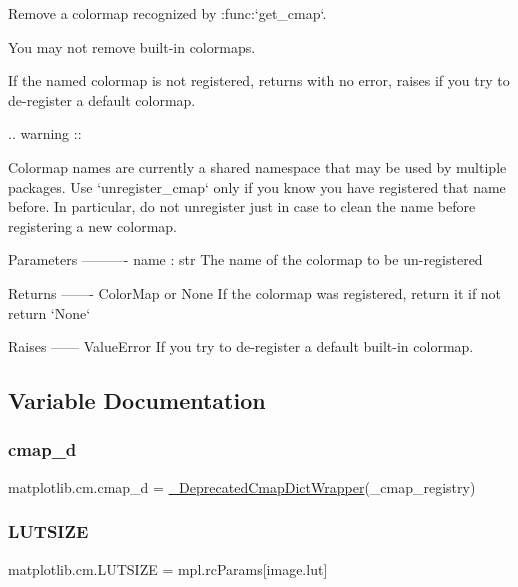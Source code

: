 \begin{DoxyVerb}Remove a colormap recognized by :func:`get_cmap`.

You may not remove built-in colormaps.

If the named colormap is not registered, returns with no error, raises
if you try to de-register a default colormap.

.. warning ::

  Colormap names are currently a shared namespace that may be used
  by multiple packages. Use `unregister_cmap` only if you know you
  have registered that name before. In particular, do not
  unregister just in case to clean the name before registering a
  new colormap.

Parameters
----------
name : str
    The name of the colormap to be un-registered

Returns
-------
ColorMap or None
    If the colormap was registered, return it if not return `None`

Raises
------
ValueError
   If you try to de-register a default built-in colormap.\end{DoxyVerb}
 

\subsection{Variable Documentation}
\mbox{\label{namespacematplotlib_1_1cm_ac2dd962b18f824e3ad20f79097390148}} 
\subsubsection{\texorpdfstring{cmap\+\_\+d}{cmap\_d}}
{\footnotesize\ttfamily matplotlib.\+cm.\+cmap\+\_\+d = \hyperlink{classmatplotlib_1_1cm_1_1__DeprecatedCmapDictWrapper}{\+\_\+\+Deprecated\+Cmap\+Dict\+Wrapper}(\+\_\+cmap\+\_\+registry)}

\mbox{\label{namespacematplotlib_1_1cm_ace896a2b4d7f8028cc508f0c4da233fe}} 
\subsubsection{\texorpdfstring{L\+U\+T\+S\+I\+ZE}{LUTSIZE}}
{\footnotesize\ttfamily matplotlib.\+cm.\+L\+U\+T\+S\+I\+ZE = mpl.\+rc\+Params\mbox{[}\textquotesingle{}image.\+lut\textquotesingle{}\mbox{]}}

